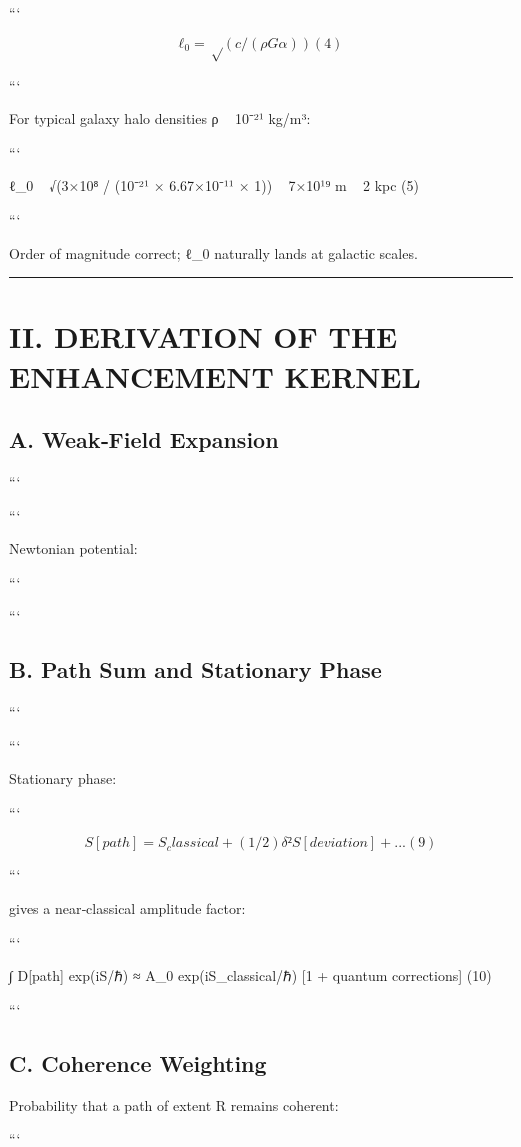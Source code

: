 \documentclass[11pt,a4paper]{article}
\begin{document}
```

\[
ℓ_0 = √(c/(ρ G α))     (4)
\]

```


For typical galaxy halo densities ρ ~ 10⁻²¹ kg/m³:

```

ℓ\_0 ~ √(3×10⁸ / (10⁻²¹ × 6.67×10⁻¹¹ × 1)) ~ 7×10¹⁹ m ~ 2 kpc     (5)

```


Order of magnitude correct; ℓ\_0 naturally lands at galactic scales.


\medskip\hrule\medskip


\section{II. DERIVATION OF THE ENHANCEMENT KERNEL}


\subsection{A. Weak‑Field Expansion}


```

```


Newtonian potential:

```

```


\subsection{B. Path Sum and Stationary Phase}


```

```


Stationary phase:

```

\[
S[path] = S_classical + (1/2)δ²S[deviation] + ...     (9)
\]

```


gives a near‑classical amplitude factor:

```

∫ D[path] exp(iS/ℏ) ≈ A\_0 exp(iS\_classical/ℏ) [1 + quantum corrections]     (10)

```


\subsection{C. Coherence Weighting}


Probability that a path of extent R remains coherent:

```
\end{document}

